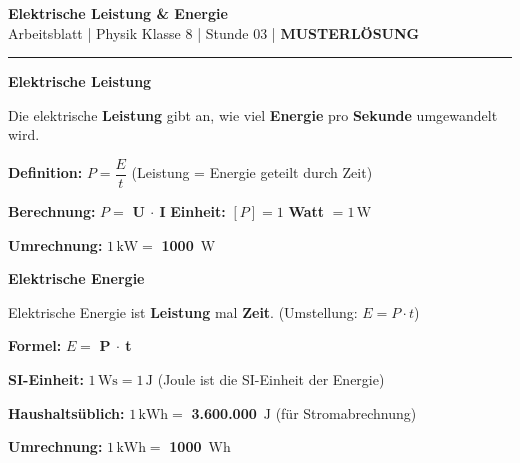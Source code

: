 \documentclass[11pt, a4paper]{article}
\newcommand{\fach}{Physik}
\newcommand{\thema}{Elektrische Leistung \& Energie}
\newcommand{\klasse}{8}
\newcommand{\stunde}{03}
\newcommand{\lsg}[1]{\textcolor{loesung}{\textbf{#1}}}
\newcommand{\ein}[1]{\,\mathrm{#1}}
\begin{document}
\begin{center}
    {\Large\bfseries\textcolor{fachfarbe}{\thema}}\\[0.2em]
    {\small Arbeitsblatt | \fach{} Klasse \klasse{} | Stunde \stunde{} | \textcolor{loesung}{\textbf{MUSTERLÖSUNG}}}
\end{center}
\vspace{-0.3em}
\hrule
\vspace{0.6em}


\begin{merkkasten}
\textbf{Elektrische Leistung}

Die elektrische \lsg{Leistung} gibt an, wie viel \lsg{Energie} pro \lsg{Sekunde} umgewandelt wird.

\vspace{0.3em}
\textbf{Definition:} \quad $P = \dfrac{E}{t}$ \quad (Leistung = Energie geteilt durch Zeit)

\vspace{0.3em}
\textbf{Berechnung:} \quad $P = $ \lsg{U $\cdot$ I} \qquad
\textbf{Einheit:} \quad $[P] = 1$ \lsg{Watt} $= 1\ein{W}$

\vspace{0.3em}
\textbf{Umrechnung:} \quad $1\ein{kW} = $ \lsg{1000} $\ein{W}$
\end{merkkasten}


\begin{merkkasten}
\textbf{Elektrische Energie}

Elektrische Energie ist \lsg{Leistung} mal \lsg{Zeit}. \quad (Umstellung: $E = P \cdot t$)

\vspace{0.3em}
\textbf{Formel:} \quad $E = $ \lsg{P $\cdot$ t}

\vspace{0.3em}
\textbf{SI-Einheit:} \quad $1\ein{Ws} = 1\ein{J}$ \quad (Joule ist die SI-Einheit der Energie)

\vspace{0.3em}
\textbf{Haushaltsüblich:} \quad $1\ein{kWh} = $ \lsg{3.600.000} $\ein{J}$ \quad (für Stromabrechnung)

\vspace{0.3em}
\textbf{Umrechnung:} \quad $1\ein{kWh} = $ \lsg{1000} $\ein{Wh}$
\end{merkkasten}
\end{document}
